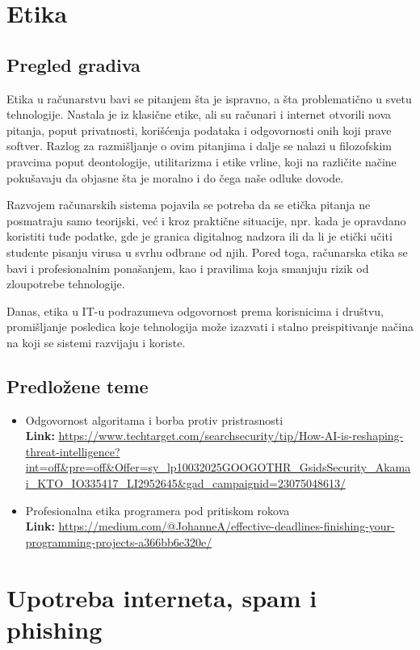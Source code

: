 \documentclass[a4paper,12pt]{article}
\begin{document}
\section{Etika}
\subsection{Pregled gradiva}
Etika u računarstvu bavi se pitanjem šta je ispravno, a šta problematično u svetu tehnologije. Nastala je iz klasične etike, ali su računari i internet otvorili nova pitanja, poput privatnosti, korišćenja podataka i odgovornosti onih koji prave softver. Razlog za razmišljanje o ovim pitanjima i dalje se nalazi u filozofskim pravcima poput deontologije, utilitarizma i etike vrline, koji na različite načine pokušavaju da objasne šta je moralno i do čega naše odluke dovode.

Razvojem računarskih sistema pojavila se potreba da se etička pitanja ne posmatraju samo teorijski, već i kroz praktične situacije, npr. kada je opravdano koristiti tuđe podatke, gde je granica digitalnog nadzora ili da li je etički učiti studente pisanju virusa u svrhu odbrane od njih. Pored toga, računarska etika se bavi i profesionalnim ponašanjem, kao i pravilima koja smanjuju rizik od zloupotrebe tehnologije.

Danas, etika u IT-u podrazumeva odgovornost prema korisnicima i društvu, promišljanje posledica koje tehnologija može izazvati i stalno preispitivanje načina na koji se sistemi razvijaju i koriste.

\subsection{Predložene teme}
\begin{itemize}
  \item Odgovornost algoritama i borba protiv pristrasnosti \\
  \textbf{Link:} \url{https://www.techtarget.com/searchsecurity/tip/How-AI-is-reshaping-threat-intelligence?int=off&pre=off&Offer=sy_lp10032025GOOGOTHR_GsidsSecurity_Akamai_KTO_IO335417_LI2952645&gad_campaignid=23075048613/}
  \item Profesionalna etika programera pod pritiskom rokova \\
  \textbf{Link:} \url{https://medium.com/@JohanneA/effective-deadlines-finishing-your-programming-projects-a366bb6e320e/}
\end{itemize}

\section{Upotreba interneta, spam i phishing}
\end{document}
